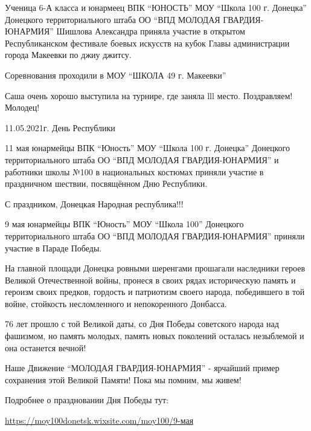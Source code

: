Ученица 6-А класса и юнармеец ВПК \enquote{ЮНОСТЬ} МОУ \enquote{Школа 100 г.
Донецка} Донецкого территориального штаба ОО \enquote{ВПД МОЛОДАЯ
ГВАРДИЯ-ЮНАРМИЯ} Шишлова Александра приняла участие в открытом Республиканском
фестивале боевых искусств на кубок Главы администрации города Макеевки по джиу
джитсу.

Соревнования проходили в МОУ \enquote{ШКОЛА 49 г. Макеевки}

Саша очень хорошо выступила на турнире, где заняла lll место. Поздравляем! Молодец!


11.05.2021г. День Республики

11 мая юнармейцы ВПК \enquote{Юность} МОУ \enquote{Школа 100 г. Донецка} Донецкого
территориального штаба ОО \enquote{ВПД МОЛОДАЯ ГВАРДИЯ-ЮНАРМИЯ} и работники школы №100
в национальных костюмах приняли участие в праздничном шествии, посвящённом Дню
Республики.

С праздником, Донецкая Народная республика!!!


  9 мая юнармейцы ВПК \enquote{Юность} МОУ \enquote{Школа 100}
Донецкого территориального штаба ОО \enquote{ВПД МОЛОДАЯ ГВАРДИЯ-ЮНАРМИЯ}
приняли участие в Параде Победы.

На главной площади Донецка ровными шеренгами прошагали наследники героев
Великой Отечественной войны, пронеся в своих рядах историческую память и
героизм своих предков, гордость и патриотизм своего народа, победившего в той
войне, стойкость несломленного и непокоренного Донбасса.

76 лет прошло с той Великой даты, со Дня Победы советского народа над фашизмом,
но память молодых, память новых поколений осталась незыблемой и она останется
вечной!

Наше Движение \enquote{МОЛОДАЯ ГВАРДИЯ-ЮНАРМИЯ} - ярчайший пример сохранения
этой Великой Памяти!  Пока мы помним, мы живем!


Подробнее о праздновании Дня Победы тут: 

\url{https://moy100donetsk.wixsite.com/moy100/9-мая}


